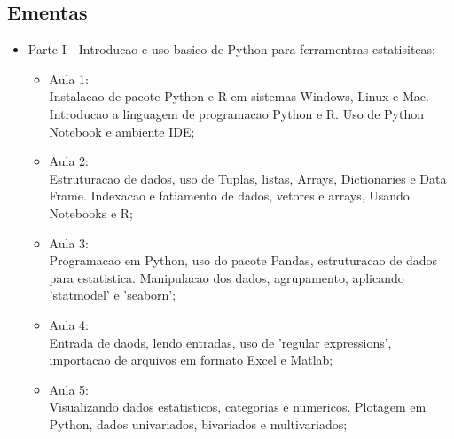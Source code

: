 \documentclass[oneside,a4paper,12pt]{article}
\begin{document}
	\begin{snugshade}
		\section{Ementas} %
	\end{snugshade}
		\begin{itemize}
		\item Parte I - Introducao e uso basico de Python para ferramentras estatisitcas:
		 \begin{itemize}
			\item Aula 1:\\
			Instalacao de pacote Python e R em sistemas Windows, Linux e Mac. Introducao a linguagem de programacao Python e R. Uso de Python Notebook e ambiente IDE;
			\item Aula 2:\\
			Estruturacao de dados, uso de Tuplas, listas, Arrays, Dictionaries e Data Frame. Indexacao e fatiamento de dados, vetores e arrays, Usando Notebooks e R;
			\item Aula 3:\\
			Programacao em Python, uso do pacote Pandas, estruturacao de dados para estatistica. Manipulacao dos dados, agrupamento, aplicando 'statmodel' e 'seaborn';
			\item Aula 4:\\
			Entrada de daods, lendo entradas, uso de 'regular expressions', importacao de arquivos em formato Excel e Matlab;
			\item Aula 5:\\
			Visualizando dados estatisticos, categorias e numericos. Plotagem em Python, dados univariados, bivariados e multivariados;
			

\end{itemize}
\end{itemize}
\end{document}
